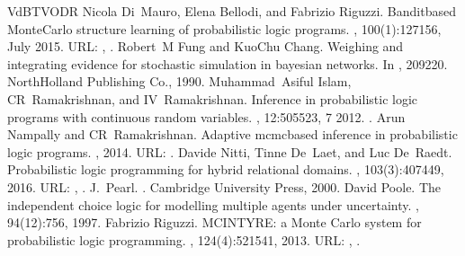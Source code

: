 \documentclass[letterpaper,10pt,english]{sphinxmanual}
\begin{document}
\begin{sphinxthebibliography}{VdBTVODR}
Nicola Di Mauro, Elena Bellodi, and Fabrizio Riguzzi. Bandit\sphinxhyphen{}based Monte\sphinxhyphen{}Carlo structure learning of probabilistic logic programs. , 100(1):127\textendash{}156, July 2015. URL: , .
\sphinxAtStartPar
Robert M Fung and Kuo\sphinxhyphen{}Chu Chang. Weighing and integrating evidence for stochastic simulation in bayesian networks. In , 209\textendash{}220. North\sphinxhyphen{}Holland Publishing Co., 1990.
\sphinxAtStartPar
Muhammad Asiful Islam, CR Ramakrishnan, and IV Ramakrishnan. Inference in probabilistic logic programs with continuous random variables. , 12:505\textendash{}523, 7 2012. .
\sphinxAtStartPar
Arun Nampally and CR Ramakrishnan. Adaptive mcmc\sphinxhyphen{}based inference in probabilistic logic programs. , 2014. URL: .
\sphinxAtStartPar
Davide Nitti, Tinne De Laet, and Luc De Raedt. Probabilistic logic programming for hybrid relational domains. , 103(3):407\textendash{}449, 2016. URL: , .
\sphinxAtStartPar
J. Pearl. . Cambridge University Press, 2000.
\sphinxAtStartPar
David Poole. The independent choice logic for modelling multiple agents under uncertainty. , 94(1\sphinxhyphen{}2):7\textendash{}56, 1997.
\sphinxAtStartPar
Fabrizio Riguzzi. MCINTYRE: a Monte Carlo system for probabilistic logic programming. , 124(4):521\textendash{}541, 2013. URL: , .

\end{sphinxthebibliography}
\end{document}
